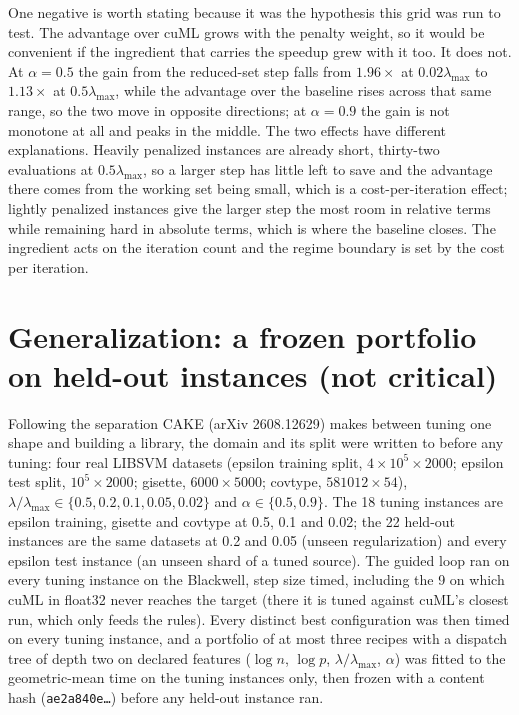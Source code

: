 \documentclass[11pt]{article}
\begin{document}
One negative is worth stating because it was the hypothesis this grid was run
to test. The advantage over cuML grows with the penalty weight, so it would be
convenient if the ingredient that carries the speedup grew with it too. It does
not. At $\alpha = 0.5$ the gain from the reduced-set step falls from
$1.96\times$ at $0.02\lambda_{\max}$ to $1.13\times$ at $0.5\lambda_{\max}$,
while the advantage over the baseline rises across that same range, so the two
move in opposite directions; at $\alpha = 0.9$ the gain is not monotone at all
and peaks in the middle. The two effects have different explanations. Heavily
penalized instances are already short, thirty-two evaluations at
$0.5\lambda_{\max}$, so a larger step has little left to save and the advantage
there comes from the working set being small, which is a cost-per-iteration
effect; lightly penalized instances give the larger step the most room in
relative terms while remaining hard in absolute terms, which is where the
baseline closes. The ingredient acts on the iteration count and the regime
boundary is set by the cost per iteration.

\section{Generalization: a frozen portfolio on held-out instances (not critical)}
\label{app:log:general}

 Following
the separation CAKE (arXiv 2608.12629) makes between tuning one shape and building a
library, the domain and its split were written to before any
tuning: four real LIBSVM datasets (epsilon training split,
$4\times10^5\times2000$; epsilon test split, $10^5\times2000$; gisette, $6000\times5000$;
covtype, $581012\times54$), $\lambda/\lambda_{\max}\in\{0.5, 0.2, 0.1, 0.05, 0.02\}$ and
$\alpha\in\{0.5, 0.9\}$. The 18 tuning instances are epsilon training, gisette and
covtype at 0.5, 0.1 and 0.02; the 22 held-out instances are the same datasets at 0.2
and 0.05 (unseen regularization) and every epsilon test instance (an unseen shard of a
tuned source). The guided loop ran on every tuning instance on the Blackwell, step
size timed, including the 9 on which cuML in float32 never reaches the target (there
it is tuned against cuML's closest run, which only feeds the rules). Every distinct
best configuration was then timed on every tuning instance, and a portfolio of at most
three recipes with a dispatch tree of depth two on declared features ($\log n$,
$\log p$, $\lambda/\lambda_{\max}$, $\alpha$) was fitted to the geometric-mean time on the
tuning instances only, then frozen with a content hash (\texttt{ae2a840e\ldots}) before
any held-out instance ran.
\end{document}

